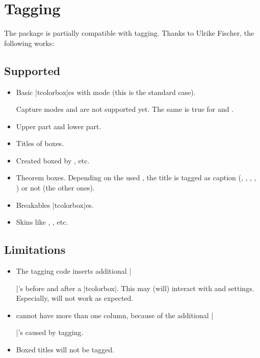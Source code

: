 \clearpage
\section{Tagging}%
%

The package is partially compatible with tagging.
Thanks to Ulrike Fischer, the following works:

\subsection{Supported}

\begin{itemize}
\item Basic |tcolorbox|es with  mode  (this is the standard case).\par
  Capture modes  and  are not supported yet.
  The same is true for  and .
\item Upper part and lower part.
\item Titles of boxes.
\item Created boxed by , etc.
\item Theorem boxes. Depending on the used , the
  title is tagged as caption (, , ,
      , ) or not (the other ones).
\item Breakables |tcolorbox|es.
\item Skins like , , etc.
\end{itemize}

\subsection{Limitations}
\begin{itemize}
\item The tagging code inserts additional |\par|'s before and after a |tcolorbox|.
  This may (will) interact with  and  settings.
  Especially,  will not work as expected.
\item {} cannot have more than one column, because of the
  additional |\par|'s caused by tagging.
\item Boxed titles will not be tagged.
\end{itemize}
